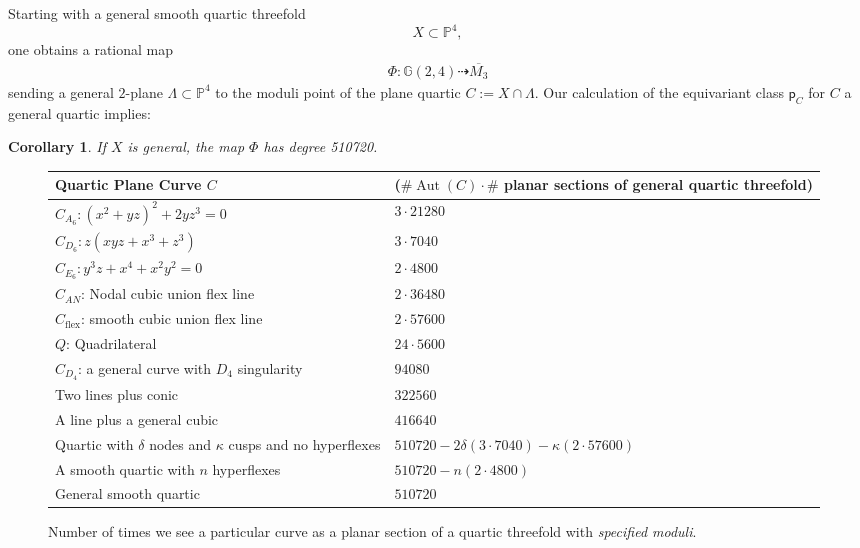 \documentclass[12 pt, reqno]{amsart}
\newtheorem{cor}[thm]{Corollary}
\theoremstyle{definition}
\newcommand{\on}{\operatorname}
\newcommand{\mb}{\mathbb}
\newcommand{\p}{\mathsf{p}}
\begin{document}
Starting with a general smooth quartic threefold
\[X\subset \mathbb{P}^4,\]
one obtains a rational map
\begin{align*}
   \Phi:  \mb{G}(2,4)\dashrightarrow \overline{M_3}
\end{align*}
sending a general $2$-plane $\Lambda\subset\mathbb{P}^4$ to the moduli
point of the plane quartic $C := X \cap \Lambda$. Our calculation of
the equivariant class $\p_{C}$ for $C$ a general quartic implies:
\begin{cor}
\label{numberplanesection}
If $X$ is general, the map $\Phi$ has degree 510720.
\end{cor}

\begin{figure}[p]
\begin{longtable}{p{6.5cm} | p{9cm}}
  Quartic Plane Curve $C$ & ($\#\on{Aut}(C)\cdot \#$ planar sections of general quartic threefold)\\\hline
  $C_{A_6}: (x^2 + yz)^2 + 2yz^3 = 0$ & 
                                        $ 3\cdot21280$\\
  $C_{D_6}: z(xyz + x^{3} + z^{3})$ &$3\cdot 7040$\\
  $C_{E_6}: y^3z + x^4 + x^2y^2 = 0$ &
                                       $2\cdot 4800$\\
  $C_{AN}$: Nodal cubic union flex line & $2\cdot 36480$\\
  $C_{\on{flex}}$: smooth cubic union flex line & $2\cdot 57600$\\
  $Q$: Quadrilateral &  
                       $24\cdot 5600$\\
  $C_{D_{4}}$: a general curve with $D_4$ singularity & 
                                                        $94080$
  \\
  Two lines plus conic & $322560$\\
  A line plus a general cubic & 
                                $416640$
  \\
  Quartic with $\delta$ nodes and $\kappa$ cusps and no hyperflexes& $510720-2\delta (3\cdot 7040)-\kappa (2\cdot 57600)$\\
  A smooth quartic with $n$ hyperflexes &  $510720-n(2\cdot 4800)$\\
  General smooth quartic & $510720$
\end{longtable}
\caption{Number of times we see a particular curve as a planar section
  of a quartic threefold with \emph{specified moduli}.}
\label{sectiontable}
\end{figure}
\end{document}
